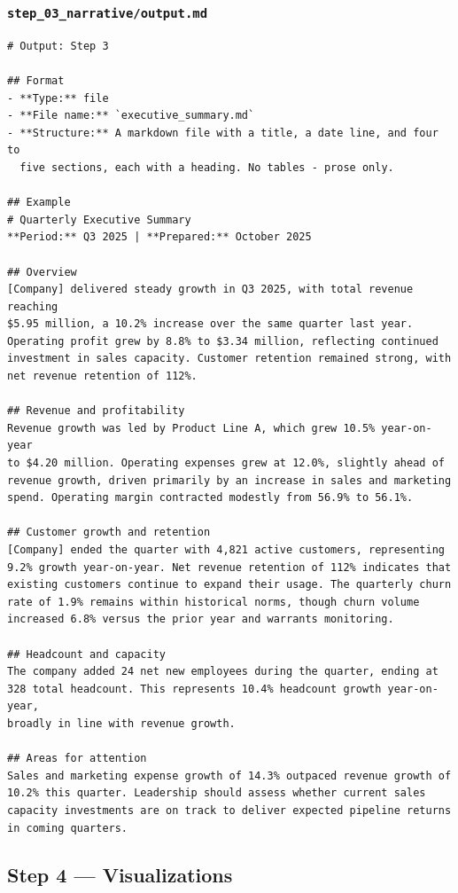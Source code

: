 \documentclass[12pt, a4paper]{article}
\begin{document}
\subsubsection{\texttt{step\_03\_narrative/output.md}}

\begin{lstlisting}[language={}]
# Output: Step 3

## Format
- **Type:** file
- **File name:** `executive_summary.md`
- **Structure:** A markdown file with a title, a date line, and four to
  five sections, each with a heading. No tables - prose only.

## Example
# Quarterly Executive Summary
**Period:** Q3 2025 | **Prepared:** October 2025

## Overview
[Company] delivered steady growth in Q3 2025, with total revenue reaching
$5.95 million, a 10.2% increase over the same quarter last year.
Operating profit grew by 8.8% to $3.34 million, reflecting continued
investment in sales capacity. Customer retention remained strong, with
net revenue retention of 112%.

## Revenue and profitability
Revenue growth was led by Product Line A, which grew 10.5% year-on-year
to $4.20 million. Operating expenses grew at 12.0%, slightly ahead of
revenue growth, driven primarily by an increase in sales and marketing
spend. Operating margin contracted modestly from 56.9% to 56.1%.

## Customer growth and retention
[Company] ended the quarter with 4,821 active customers, representing
9.2% growth year-on-year. Net revenue retention of 112% indicates that
existing customers continue to expand their usage. The quarterly churn
rate of 1.9% remains within historical norms, though churn volume
increased 6.8% versus the prior year and warrants monitoring.

## Headcount and capacity
The company added 24 net new employees during the quarter, ending at
328 total headcount. This represents 10.4% headcount growth year-on-year,
broadly in line with revenue growth.

## Areas for attention
Sales and marketing expense growth of 14.3% outpaced revenue growth of
10.2% this quarter. Leadership should assess whether current sales
capacity investments are on track to deliver expected pipeline returns
in coming quarters.
\end{lstlisting}

\subsection{Step 4 — Visualizations}
\end{document}
